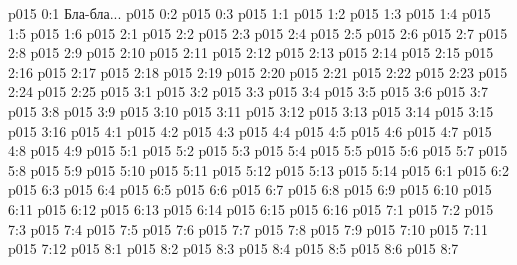 \author{Всеобщий Цензор}
\vs p015 0:1  Бла-бла...
\vs p015 0:2 
\vs p015 0:3 
\vs p015 1:1 
\vs p015 1:2 
\vs p015 1:3 
\vs p015 1:4 \pc 
\vs p015 1:5 
\vs p015 1:6 
\vs p015 2:1 
\vs p015 2:2 \pc 
\vs p015 2:3 
\vs p015 2:4 
\vs p015 2:5 
\vs p015 2:6 
\vs p015 2:7 
\vs p015 2:8 
\vs p015 2:9 
\vs p015 2:10 \pc 
\vs p015 2:11 
\vs p015 2:12 
\vs p015 2:13 
\vs p015 2:14 
\vs p015 2:15 
\vs p015 2:16 
\vs p015 2:17 
\vs p015 2:18 
\vs p015 2:19 
\vs p015 2:20 
\vs p015 2:21 
\vs p015 2:22 
\vs p015 2:23 
\vs p015 2:24 
\vs p015 2:25 \pc 
{}
\vs p015 3:1 
\vs p015 3:2 
\vs p015 3:3 
\vs p015 3:4 \pc 
\vs p015 3:5 
\vs p015 3:6 
\vs p015 3:7 \pc 
\vs p015 3:8 
\vs p015 3:9 
\vs p015 3:10 
\vs p015 3:11 
\vs p015 3:12 
\vs p015 3:13 
\vs p015 3:14 
\vs p015 3:15 \pc 
\vs p015 3:16 \pc 
{}
\vs p015 4:1 
\vs p015 4:2 
\vs p015 4:3 
\vs p015 4:4 \pc 
\vs p015 4:5 \pc 
\vs p015 4:6 
\vs p015 4:7 
\vs p015 4:8 
\vs p015 4:9 
\vs p015 5:1 
\vs p015 5:2 
\vs p015 5:3 
\vs p015 5:4 
\vs p015 5:5 
\vs p015 5:6 
\vs p015 5:7 
\vs p015 5:8 
\vs p015 5:9 
\vs p015 5:10 
\vs p015 5:11 
\vs p015 5:12 
\vs p015 5:13 
\vs p015 5:14 \pc 
{}
\vs p015 6:1 
\vs p015 6:2 
\vs p015 6:3 
\vs p015 6:4 
\vs p015 6:5 
\vs p015 6:6 
\vs p015 6:7 \pc 
\vs p015 6:8 \pc 
\vs p015 6:9 
\vs p015 6:10 
\vs p015 6:11 \pc 
\vs p015 6:12 \pc 
\vs p015 6:13 
\vs p015 6:14 \pc 
\vs p015 6:15 
\vs p015 6:16 
\vs p015 7:1 
\vs p015 7:2 \pc 
\vs p015 7:3 \pc 
\vs p015 7:4 
\vs p015 7:5 \pc 
\vs p015 7:6 \pc 
\vs p015 7:7 \pc 
\vs p015 7:8 \pc 
\vs p015 7:9 \pc 
\vs p015 7:10 \pc 
\vs p015 7:11 
\vs p015 7:12 \pc 
{}
\vs p015 8:1 
\vs p015 8:2 
\vs p015 8:3 \pc 
\vs p015 8:4 
\vs p015 8:5 
\vs p015 8:6 
\vs p015 8:7 
